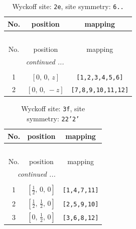 \documentclass[fleqn,8pt]{jsarticle}
\begin{document}
\begin{longtable}{ccc}
\caption{Wyckoff site: {\tt 2e}, site symmetry: {\tt 6..}}
 \\
 \hline \hline
No. & position & mapping \\ \hline \endfirsthead

\multicolumn{2}{l}{\tablename\ \thetable{}} \\
 \hline \hline
No. & position & mapping \\ \hline \endhead

 \hline \hline
\multicolumn{2}{r}{\footnotesize\it continued ...} \\ \endfoot

 \hline \hline
\multicolumn{2}{r}{} \\ \endlastfoot

1 & $\left[ 0,\, 0,\, z \right]$ & {\tt [1,2,3,4,5,6]} \\ \hline
2 & $\left[ 0,\, 0,\, - z \right]$ & {\tt [7,8,9,10,11,12]} \\
\end{longtable}
\renewcommand{\arraystretch}{1.2}
\begin{longtable}{ccc}
\caption{Wyckoff site: {\tt 3f}, site symmetry: {\tt 22'2'}}
 \\
 \hline \hline
No. & position & mapping \\ \hline \endfirsthead

\multicolumn{2}{l}{\tablename\ \thetable{}} \\
 \hline \hline
No. & position & mapping \\ \hline \endhead

 \hline \hline
\multicolumn{2}{r}{\footnotesize\it continued ...} \\ \endfoot

 \hline \hline
\multicolumn{2}{r}{} \\ \endlastfoot

1 & $\left[ \frac{1}{2},\, 0,\, 0 \right]$ & {\tt [1,4,7,11]} \\ \hline
2 & $\left[ \frac{1}{2},\, \frac{1}{2},\, 0 \right]$ & {\tt [2,5,9,10]} \\ \hline
3 & $\left[ 0,\, \frac{1}{2},\, 0 \right]$ & {\tt [3,6,8,12]} \\
\end{longtable}
\renewcommand{\arraystretch}{1.2}
\end{document}
